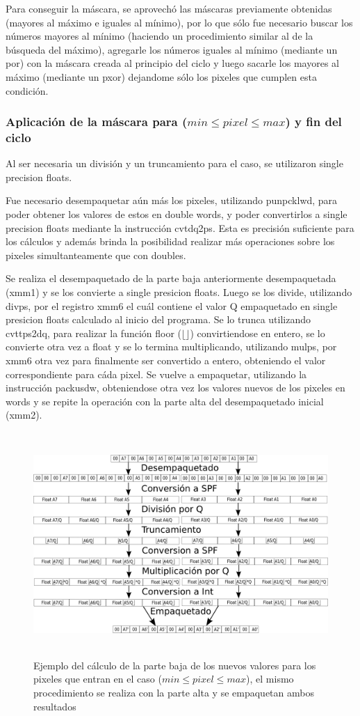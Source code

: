 Para conseguir la máscara, se aprovechó las máscaras previamente obtenidas (mayores al máximo e iguales al mínimo), por lo que sólo fue necesario buscar los números mayores al mínimo (haciendo un procedimiento similar al de la búsqueda del máximo), agregarle los números iguales al mínimo (mediante un por) con la máscara creada al principio del ciclo y luego sacarle los mayores al máximo (mediante un pxor) dejandome sólo los pixeles que cumplen esta condición.

\subsubsection{Aplicación de la máscara para ($min \leq pixel \leq max$) y fin del ciclo}
Al ser necesaria un división y un truncamiento para el caso, se utilizaron single precision floats.

Fue necesario desempaquetar aún más los pixeles, utilizando punpcklwd, para poder obtener los valores de estos en double words, y poder convertirlos a single precision floats mediante la instrucción cvtdq2ps. Esta es precisión suficiente para los cálculos y además brinda la posibilidad realizar más operaciones sobre los pixeles simultanteamente que con doubles.

Se realiza el desempaquetado de la parte baja anteriormente desempaquetada (xmm1) y se los convierte a single presicion floats. Luego se los divide, utilizando divps, por el registro xmm6 el cuál contiene el valor Q empaquetado en single presicion floats calculado al inicio del programa. Se lo trunca utilizando cvttps2dq, para realizar la función floor ($\lfloor \rfloor$) convirtiendose en entero, se lo convierte otra vez a float y se lo termina multiplicando, utilizando mulps, por xmm6 otra vez para finalmente ser convertido a entero, obteniendo el valor correspondiente para cáda pixel. Se vuelve a empaquetar, utilizando la instrucción packusdw, obteniendose otra vez los valores nuevos de los pixeles en words y se repite la operación con la parte alta del desempaquetado inicial (xmm2).

\begin{figure}[H]
\centering
\includegraphics[width=150mm, height=85mm]{calcq.png}
\caption{Ejemplo del cálculo de la parte baja de los nuevos valores para los pixeles que entran en el caso ($min \leq pixel \leq max$), el mismo procedimiento se realiza con la parte alta y se empaquetan ambos resultados}
\label{overflow}
\end{figure}

